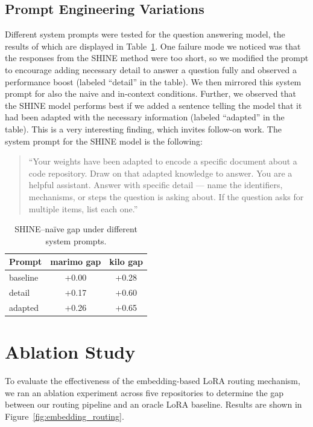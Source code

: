 \documentclass[conference,10.5pt]{IEEEtran}
\begin{document}
\subsection{Prompt Engineering Variations}
Different system prompts were tested for the question answering model, the results of which are displayed in Table~\ref{tab:prompt-gap}. One failure mode we noticed was that the responses from the SHINE method were too short, so we modified the prompt to encourage adding necessary detail to answer a question fully and observed a performance boost (labeled ``detail'' in the table). We then mirrored this system prompt for also the naive and in-context conditions. Further, we observed that the SHINE model performs best if we added a sentence telling the model that it had been adapted with the necessary information (labeled ``adapted'' in the table). This is a very interesting finding, which invites follow-on work. The system prompt for the SHINE model is the following:
\begin{quote}
``Your weights have been adapted to encode a specific document about a code repository. Draw on that adapted knowledge to answer. You are a helpful assistant. Answer with specific detail — name the identifiers, mechanisms, or steps the question is asking about. If the question asks for  multiple items, list each one.''
\end{quote}

\begin{table}[h]
\centering
\caption{SHINE--naïve gap under different system prompts.}
\label{tab:prompt-gap}
\begin{tabular}{lcc}
\toprule
\textbf{Prompt} & \textbf{marimo gap} & \textbf{kilo gap} \\
\midrule
baseline & +0.00 & +0.28 \\
detail   & +0.17 & +0.60 \\
adapted  & +0.26 & +0.65 \\
\bottomrule
\end{tabular}
\end{table}

\section{Ablation Study}

To evaluate the effectiveness of the embedding-based LoRA routing mechanism, we ran an ablation experiment across five repositories to determine the gap between our routing pipeline and an oracle LoRA baseline. Results are shown in Figure~\ref{fig:embedding_routing}.
 
\end{document}
